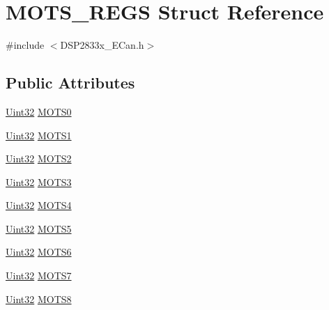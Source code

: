 \hypertarget{struct_m_o_t_s___r_e_g_s}{}\section{M\+O\+T\+S\+\_\+\+R\+E\+G\+S Struct Reference}
\label{struct_m_o_t_s___r_e_g_s}


{\ttfamily \#include $<$D\+S\+P2833x\+\_\+\+E\+Can.\+h$>$}

\subsection*{Public Attributes}
\begin{DoxyCompactItemize}
\item 
\hyperlink{_d_s_p2833x___device_8h_aba99025e657f892beb7ff31cecf64653}{Uint32} \hyperlink{struct_m_o_t_s___r_e_g_s_a60a93027539b550013131b3c9278ef23}{M\+O\+T\+S0}
\item 
\hyperlink{_d_s_p2833x___device_8h_aba99025e657f892beb7ff31cecf64653}{Uint32} \hyperlink{struct_m_o_t_s___r_e_g_s_ac0b31f345d3e0662315198f9b036a1a0}{M\+O\+T\+S1}
\item 
\hyperlink{_d_s_p2833x___device_8h_aba99025e657f892beb7ff31cecf64653}{Uint32} \hyperlink{struct_m_o_t_s___r_e_g_s_a93bdf1c3ac5c9dc7dab32c9be362b326}{M\+O\+T\+S2}
\item 
\hyperlink{_d_s_p2833x___device_8h_aba99025e657f892beb7ff31cecf64653}{Uint32} \hyperlink{struct_m_o_t_s___r_e_g_s_afacb91f8a65881fabac67350c4e703fe}{M\+O\+T\+S3}
\item 
\hyperlink{_d_s_p2833x___device_8h_aba99025e657f892beb7ff31cecf64653}{Uint32} \hyperlink{struct_m_o_t_s___r_e_g_s_ac9e51c456df527aeb9cc083679aaa2b4}{M\+O\+T\+S4}
\item 
\hyperlink{_d_s_p2833x___device_8h_aba99025e657f892beb7ff31cecf64653}{Uint32} \hyperlink{struct_m_o_t_s___r_e_g_s_a6e4e0dc30ffae3387f693af8d88bdee6}{M\+O\+T\+S5}
\item 
\hyperlink{_d_s_p2833x___device_8h_aba99025e657f892beb7ff31cecf64653}{Uint32} \hyperlink{struct_m_o_t_s___r_e_g_s_acf24f0833a4519c68ed12f63d72e3531}{M\+O\+T\+S6}
\item 
\hyperlink{_d_s_p2833x___device_8h_aba99025e657f892beb7ff31cecf64653}{Uint32} \hyperlink{struct_m_o_t_s___r_e_g_s_a72ed8d869ddb295ba109bfa070e49aad}{M\+O\+T\+S7}
\item 
\hyperlink{_d_s_p2833x___device_8h_aba99025e657f892beb7ff31cecf64653}{Uint32} \hyperlink{struct_m_o_t_s___r_e_g_s_a2fc9e5c92c4977f0798c89a8f7fadf92}{M\+O\+T\+S8}

\end{DoxyCompactItemize}
